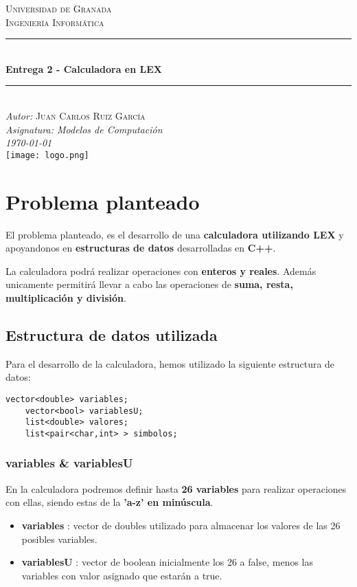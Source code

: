 \documentclass[12pt]{article}
\begin{document}
  
    \hypersetup{pageanchor=false}

    \begin{titlepage}
        \newcommand{\HRule}{\rule{\linewidth}{0.5mm}}
        \center
        \textsc{\LARGE Universidad de Granada}\\[1cm] 
        \textsc{\large Ingeniería Informática}\\[0.5cm] 
        \HRule \\[0.4cm]
        { \huge \bfseries Entrega 2 - Calculadora en LEX}\\[0.4cm]
        \HRule \\[1.5cm]
        \large\emph{Autor: }\textsc{Juan Carlos Ruiz García}\\
        {\large\emph{Asignatura: Modelos de Computación }}\\
        {\large\emph\today}\\[2cm]
        \texttt{[image: logo.png]}\\[1cm]
        \vfill
    \end{titlepage}

    \hypersetup{pageanchor=true}
    \tableofcontents
    \clearpage

\section{Problema planteado}

El problema planteado, es el desarrollo de una \textbf{calculadora utilizando LEX} y apoyandonos en \textbf{estructuras de datos} desarrolladas en \textbf{C++}.

La calculadora podrá realizar operaciones con \textbf{enteros y reales}. Además unicamente permitirá llevar a cabo las operaciones de \textbf{suma, resta, multiplicación y división}.


\subsection{Estructura de datos utilizada}
Para el desarrollo de la calculadora, hemos utilizado la siguiente estructura de datos:
\begin{lstlisting}[frame=single]
    vector<double> variables;
    vector<bool> variablesU;
    list<double> valores;
    list<pair<char,int> > simbolos;
\end{lstlisting}

\subsubsection{variables \& variablesU}
En la calculadora podremos definir hasta \textbf{26 variables} para realizar operaciones con ellas, siendo estas de la \textbf{'a-z' en minúscula}.
\begin{itemize}
    \item \textbf{variables} : vector de doubles utilizado para almacenar los valores de las 26 posibles variables.
    \item \textbf{variablesU} : vector de boolean inicialmente los 26 a false, menos las variables con valor asignado que estarán a true.
\end{itemize}
\end{document}
